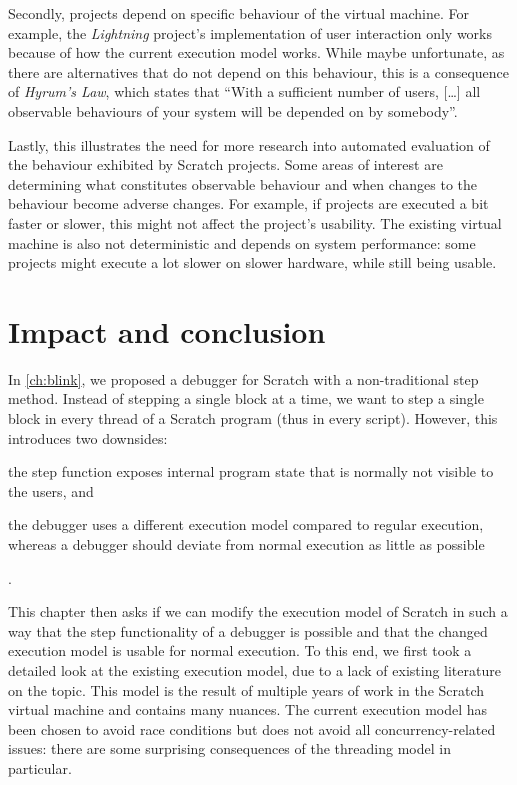 \documentclass[../main]{subfiles}
\begin{document}
Secondly, projects depend on specific behaviour of the virtual machine.
For example, the \textit{Lightning} project's implementation of user interaction only works because of how the current execution model works.
While maybe unfortunate, as there are alternatives that do not depend on this behaviour, this is a consequence of \textit{Hyrum's Law}, which states that ``With a sufficient number of users, [\dots] all observable behaviours of your system will be depended on by somebody''.

Lastly, this illustrates the need for more research into automated evaluation of the behaviour exhibited by Scratch projects.
Some areas of interest are determining what constitutes observable behaviour and when changes to the behaviour become adverse changes.
For example, if projects are executed a bit faster or slower, this might not affect the project's usability.
The existing virtual machine is also not deterministic and depends on system performance: some projects might execute a lot slower on slower hardware, while still being usable.

\section{Impact and conclusion}\label{sec:conclusion}

In \cref{ch:blink}, we proposed a debugger for Scratch with a non-traditional step method.
Instead of stepping a single block at a time, we want to step a single block in every thread of a Scratch program (thus in every script).
However, this introduces two downsides:
\begin{enumerate*}[label=\emph{\roman*})]
    \item the step function exposes internal program state that is normally not visible to the users, and
    \item the debugger uses a different execution model compared to regular execution, whereas a debugger should deviate from normal execution as little as possible
\end{enumerate*}.

This chapter then asks if we can modify the execution model of Scratch in such a way that the step functionality of a debugger is possible and that the changed execution model is usable for normal execution.
To this end, we first took a detailed look at the existing execution model, due to a lack of existing literature on the topic.
This model is the result of multiple years of work in the Scratch virtual machine and contains many nuances.
The current execution model has been chosen to avoid race conditions but does not avoid all concurrency-related issues: there are some surprising consequences of the threading model in particular.
\end{document}
